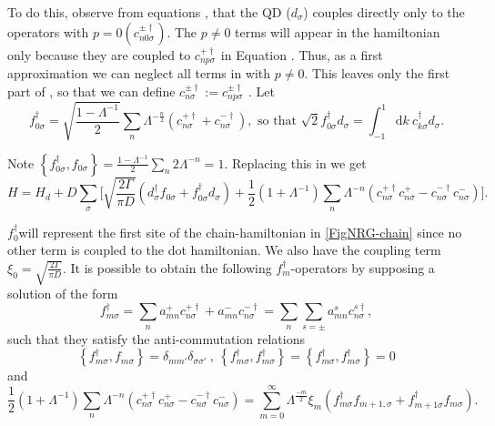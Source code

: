 To do this, observe from equations ,
that the QD ($d_{\sigma}$) couples directly only to the operators
with $p=0$$\left(c_{n0\sigma}^{\pm\dagger}\right)$. The $p\neq0$
terms will appear in the hamiltonian only because they are coupled
to $c_{np\sigma}^{+\dagger}$ in Equation .
Thus, as a first approximation we can neglect all terms in 
with $p\neq0$. This leaves only the first part of ,
so that we can define $c_{n\sigma}^{\pm\dagger}:=c_{np\sigma}^{\pm\dagger}$
. Let 
\begin{equation}
f_{0\sigma}^{\dagger}=\sqrt{\frac{1-\Lambda^{-1}}{2}}\sum_{n}\Lambda^{-\frac{n}{2}}\left(c_{n\sigma}^{+\dagger}+c_{n\sigma}^{-\dagger}\right),\mbox{ so that }\sqrt{2}f_{0\sigma}^{\dagger}d_{\sigma}=\int_{-1}^{1}\mbox{d}k\ c_{k\sigma}^{\dagger}d_{\sigma}.\label{eq:f_0}
\end{equation}


Note $\left\{ f_{0\sigma}^{\dagger},f_{0\sigma}\right\} =\frac{1-\Lambda^{-1}}{2}\sum_{n}2\Lambda^{-n}=1$.
Replacing this in we get 
\[
H=H_{d}+D\sum_{\sigma}\Biggl[\sqrt{\frac{2\Gamma}{\pi D}}\left(d_{\sigma}^{\dagger}f_{0\sigma}+f_{0\sigma}^{\dagger}d_{\sigma}\right)+\frac{1}{2}\left(1+\Lambda^{-1}\right)\sum_{n}\Lambda^{-n}\left(c_{n\sigma}^{+\dagger}c_{n\sigma}^{+}-c_{n\sigma}^{-\dagger}c_{n\sigma}^{-}\right)\Biggr].
\]


$f_{0}^{\dagger}$will represent the first site of the chain-hamiltonian
in \ref{FigNRG-chain} since no other term is coupled to the dot hamiltonian.
We also have the coupling term $\xi_{0}=\sqrt{\frac{2\Gamma}{\pi D}}$.
It is possible to obtain the following $f_{m}^{\dagger}$-operators
by supposing a solution of the form 
\begin{equation}
f_{m\sigma}^{\dagger}=\sum_{n}a_{mn}^{+}c_{n\sigma}^{+\dagger}+a_{mn}^{-}c_{n\sigma}^{-\dagger}=\sum_{n}\sum_{s=\pm}a_{mn}^{s}c_{n\sigma}^{s\dagger},\label{eq:chain elements}
\end{equation}
 such that they satisfy the anti-commutation relations 
\[
\left\{ f_{m\sigma}^{\dagger},f_{m\sigma}\right\} =\delta_{mm'}\delta_{\sigma\sigma'}\ ,\ \left\{ f_{m\sigma}^{\dagger},f_{m\sigma}^{\dagger}\right\} =\left\{ f_{m\sigma}^{\dagger},f_{m\sigma}^{\dagger}\right\} =0
\]
and 
\begin{equation}
\frac{1}{2}\left(1+\Lambda^{-1}\right)\sum_{n}\Lambda^{-n}\left(c_{n\sigma}^{+\dagger}c_{n\sigma}^{+}-c_{n\sigma}^{-\dagger}c_{n\sigma}^{-}\right)=\sum_{m=0}^{\infty}\Lambda^{\frac{-m}{2}}\xi_{m}\left(f_{m\sigma}^{\dagger}f_{m+1,\sigma}+f_{m+1\sigma}^{\dagger}f_{m\sigma}\right).\label{eq:final equation}
\end{equation}


